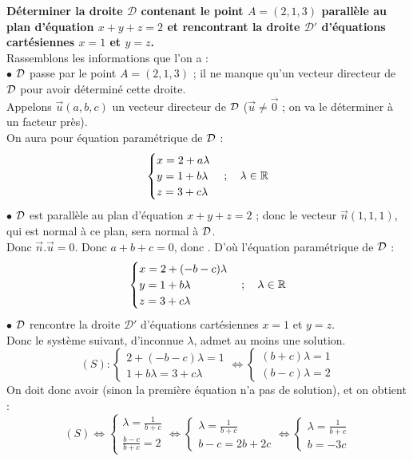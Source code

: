 \documentclass[a4paper, 11pt]{article}
\begin{document}
\begin{correction}  \;
	\textbf{D\'eterminer la droite $\mathcal{D}$ contenant le point $A=(2,1,3)$ parall\`ele au plan d'\'equation $x+y+z=2$ et rencontrant la droite $\mathcal{D}'$ d'\'equations cart\'esiennes $x=1$ et $y=z$.}\\
	Rassemblons les informations que l'on a :\\
	$\bullet$ ${\cal D}$ passe par le point $A=(2,1,3)$ ; il ne manque qu'un vecteur directeur de $\cal D$ pour avoir d\'etermin\'e cette droite.\\
	Appelons $\vec{u}(a,b,c)$ un vecteur directeur de $\cal D$ ($\vec{u}\neq \vec{0}$ ; on va le d\'eterminer \`a un facteur pr\`es).\\
	On aura pour \'equation param\'etrique de ${\cal D}$ :
	$$ \begin{cases} x=2+a \lambda\\ y=1+b \lambda\\ z=3+c \lambda \end{cases} ; \quad \lambda \in \mathbb{R} $$
	$\bullet$ ${\cal D}$ est parall\`ele au plan d'\'equation $x+y+z=2$ ; donc le vecteur $\vec{n}(1,1,1)$, qui est normal \`a ce plan, sera normal \`a $\cal D$.\\
	Donc $\vec{n}.\vec{u}=0$. Donc $a+b+c=0$, donc . D'o\`u l'\'equation param\'etrique de $\cal D$ :
	$$ \begin{cases} x=2+(-b-c) \lambda\\ y=1+b \lambda\\ z=3+c \lambda \end{cases} ; \quad \lambda\in \mathbb{R} $$
	$\bullet$ ${\cal D}$ rencontre la droite $\mathcal{D}'$ d'\'equations cart\'esiennes $x=1$ et $y=z$.\\
	Donc le syst\`eme suivant, d'inconnue $\lambda$, admet au moins une solution.
	$$ (S) : \begin{cases} 2+(-b-c) \lambda=1\\ 1+b \lambda=3+c \lambda \end{cases} \iff \begin{cases} (b+c) \lambda=1\\ (b-c) \lambda=2 \end{cases} $$
	On doit donc avoir  (sinon la premi\`ere \'equation n'a pas de solution), et on obtient :
	$$ (S) \iff \begin{cases} \lambda=\frac{1}{b+c}\\ \frac{b-c}{b+c}=2 \end{cases} \iff \begin{cases} \lambda=\frac{1}{b+c}\\ b-c=2b+2c \end{cases} \iff \begin{cases} \lambda=\frac{1}{b+c}\\ b=-3c \end{cases}  $$

\end{correction}
\end{document}
